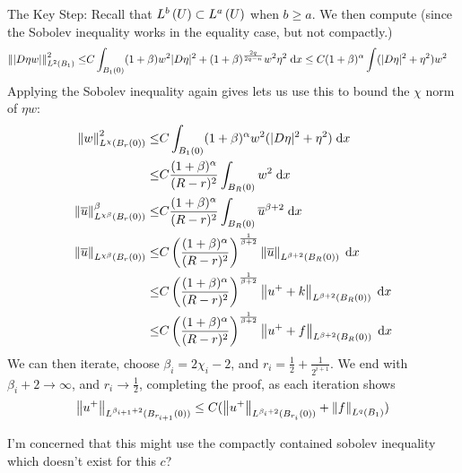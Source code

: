 The Key Step: Recall that $\lnfuncdom{b} \subset \lnfuncdom{a}$ when $b \geq a$.
We then compute (since the Sobolev inequality works in the equality case, but not compactly.)
\begin{align*}
  \lnorm{\lvert \grad \eta w \rvert}{2}{\ballunit}^2
    \leq & C \int_{\ball{0}{1}} (1 + \beta) w^2 \lvert \grad \eta \rvert^2
           + (1 + \beta)^{\frac{2 q}{2 q - n}} w^2 \eta^2 \dx
    \leq C (1 + \beta)^{\alpha} \int (\lvert \grad \eta \rvert^2 + \eta^2) w^2
\end{align*}
Applying the Sobolev inequality again gives lets us use this to bound the $\chi$ norm of $\eta w$:
\begin{align*}
  \lnorm{w}{\chi}{\ball{0}{r}}^2
    \leq & C \int_{\ball{0}{1}} (1 + \beta)^\alpha w^2 (\lvert \grad \eta \rvert^2 + \eta^2) \dx\\
    \leq & C \frac{(1 + \beta)^\alpha}{(R - r)^2} \int_{\ball{0}{R}} w^2 \dx\\
  \lnorm{\overline{u}}{\chi \beta}{\ball{0}{r}}^\beta
    \leq & C \frac{(1 + \beta)^\alpha}{(R - r)^2} \int_{\ball{0}{R}} \overline{u}^{\beta + 2} \dx\\
  \lnorm{\overline{u}}{\chi \beta}{\ball{0}{r}}
    \leq & C \left( \frac{(1 + \beta)^\alpha}{(R - r)^2} \right)^{\frac{1}{\beta + 2}} \lnorm{\overline{u}}{\beta + 2}{\ball{0}{R}} \dx\\
    \leq & C \left( \frac{(1 + \beta)^\alpha}{(R - r)^2} \right)^{\frac{1}{\beta + 2}} \lnorm{u^+ + k}{\beta + 2}{\ball{0}{R}} \dx\\
    \leq & C \left( \frac{(1 + \beta)^\alpha}{(R - r)^2} \right)^{\frac{1}{\beta + 2}} \lnorm{u^+ + f}{\beta + 2}{\ball{0}{R}} \dx
\end{align*}
We can then iterate, choose $\beta_i = 2 \chi_i - 2$, and $r_i = \frac{1}{2} + \frac{1}{2^{i + 1}}$.
We end with $\beta_i + 2 \to \infty$, and $r_i \to \frac{1}{2}$, completing the proof,
as each iteration shows
\begin{align*}
  \lnorm{u^+}{\beta_{i + 1} + 2}{\ball{0}{r_{i + 1}}} \leq C ( \lnorm{u^+}{\beta_{i} + 2}{\ball{0}{r_i}} + \lnorm{f}{q}{\ballunit} )
\end{align*}

I'm concerned that this might use the compactly contained sobolev inequality which doesn't exist for this $c$?
